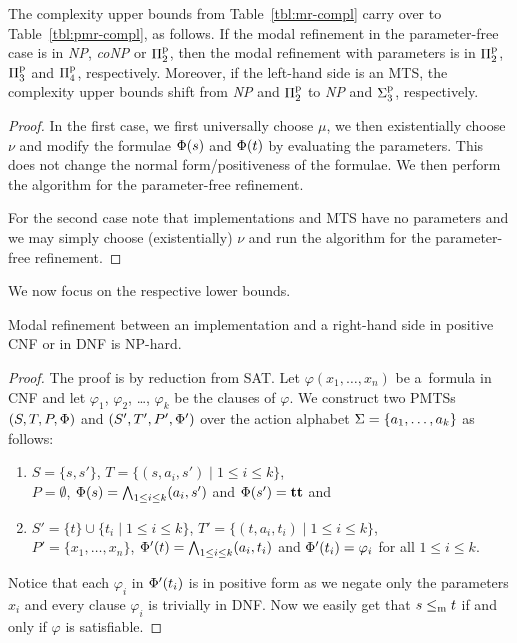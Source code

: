 \begin{proposition}
The complexity upper bounds from Table~\ref{tbl:mr-compl} carry over to Table~\ref{tbl:pmr-compl},
as follows.
If the modal refinement in the parameter-free case is in \emph{NP}, 
\emph{coNP} or $\mathrm\Pi^\mathrm p_2$,
then the modal refinement with parameters is in $\mathrm\Pi^\mathrm p_2$, $\mathrm\Pi^\mathrm p_3$ and 
$\mathrm\Pi^\mathrm p_4$, respectively.
Moreover, if the left-hand side is an MTS, the complexity upper bounds shift
from \emph{NP} and $\mathrm\Pi^\mathrm p_2$ to \emph{NP} and $\mathrm\Sigma^\mathrm p_3$, respectively.




\end{proposition}
\begin{proof}

In the first case, we first universally choose $\mu$, we then 
existentially choose $\nu$ and modify the formulae $\mathrm{\Phi}(s)$ and $\mathrm{\Phi}(t)$ 
by evaluating the parameters. This does not change the normal 
form/positiveness of the formulae.
We then perform the algorithm for the parameter-free refinement.

For the second case note that implementations and MTS have no parameters and
we may simply choose (existentially) $\nu$ and run the algorithm for the
parameter-free refinement. 

\end{proof}


We now focus on the respective lower bounds.






\begin{proposition}
Modal refinement between an implementation and a \linebreak right-hand side
in positive CNF or in DNF is NP-hard.
\end{proposition}
\begin{proof}
The proof is by reduction from SAT. 
Let $\varphi(x_1,\ldots,x_n)$ be a~formula in CNF
and let $\varphi_1$, $\varphi_2$, \ldots, $\varphi_k$ be the clauses of 
$\varphi$.
We construct two PMTSs $(S,T,P,\mathrm{\Phi})$ and $(S',T',P',\mathrm{\Phi}')$ over the
action alphabet $\mathrm{\Sigma} = \{a_1, \ldots, a_k\}$
as follows: 
\begin{enumerate}
    \item $S = \{s,s'\}$, 
    $T = \{(s, a_i, s') \mid 1 \le i \le k\}$,\\
    $P = \emptyset$, 
    $\mathrm{\Phi}(s) = \bigwedge_{1 \le i \le k} (a_i,s')$ and
    $\mathrm{\Phi}(s') = \mathbf{tt}$ and
    \item $S' = \{t\} \cup \{t_i \mid 1 \le i \le k\}$,
    $T' = \{(t,a_i,t_i) \mid 1 \le i \le k\}$, \\
    $P' = \{ x_1, \ldots, x_n \}$,
    $\mathrm{\Phi}'(t) = \bigwedge_{1 \le i \le k} (a_i,t_i)$
    and $\mathrm{\Phi}'(t_i) = \varphi_i$ for all $1 \le i \le k$.
\end{enumerate}
Notice that each $\varphi_i$ in $\mathrm{\Phi}'(t_i)$ is in positive
form as we negate only the parameters $x_i$ and every clause
$\varphi_i$ is trivially in DNF. 
Now we easily get that 
$s \le_\mathrm m t$ if and only if $\varphi$ is satisfiable.

\end{proof}



